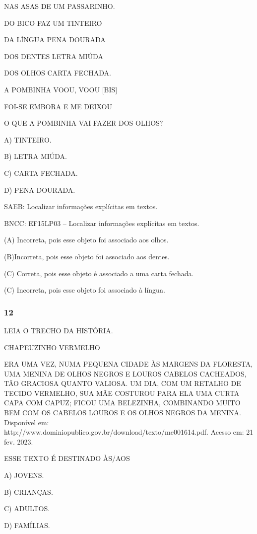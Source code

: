 NAS ASAS DE UM PASSARINHO.

DO BICO FAZ UM TINTEIRO

DA LÍNGUA PENA DOURADA

DOS DENTES LETRA MIÚDA

DOS OLHOS CARTA FECHADA.

A POMBINHA VOOU, VOOU {[}BIS{]}

FOI-SE EMBORA E ME DEIXOU

O QUE A POMBINHA VAI FAZER DOS OLHOS?

A) TINTEIRO.

B) LETRA MIÚDA.

C) CARTA FECHADA.

D) PENA DOURADA.

SAEB: Localizar informações explícitas em textos.

BNCC: EF15LP03 -- Localizar informações explícitas em textos.

(A) Incorreta, pois esse objeto foi associado aos olhos.

(B)Incorreta, pois esse objeto foi associado aos dentes.

(C) Correta, pois esse objeto é associado a uma carta fechada.

(C) Incorreta, pois esse objeto foi associado à língua. \protect\hypertarget{_heading=h.xyn2rjyn0l4h}{}{}

\subsubsection{12}\label{section-84}

LEIA O TRECHO DA HISTÓRIA.

CHAPEUZINHO VERMELHO

ERA UMA VEZ, NUMA PEQUENA CIDADE ÀS MARGENS DA FLORESTA, UMA MENINA DE OLHOS NEGROS E LOUROS CABELOS CACHEADOS, TÃO GRACIOSA QUANTO VALIOSA.
UM DIA, COM UM RETALHO DE TECIDO VERMELHO, SUA MÃE COSTUROU PARA ELA UMA CURTA CAPA COM CAPUZ; FICOU UMA BELEZINHA, COMBINANDO MUITO BEM COM OS CABELOS LOUROS E OS OLHOS NEGROS DA MENINA.\\

Disponível
em: http://www.dominiopublico.gov.br/download/texto/me001614.pdf. Acesso
em: 21 fev. 2023.

ESSE TEXTO É DESTINADO ÀS/AOS

A) JOVENS.

B) CRIANÇAS.

C) ADULTOS.

D) FAMÍLIAS.

